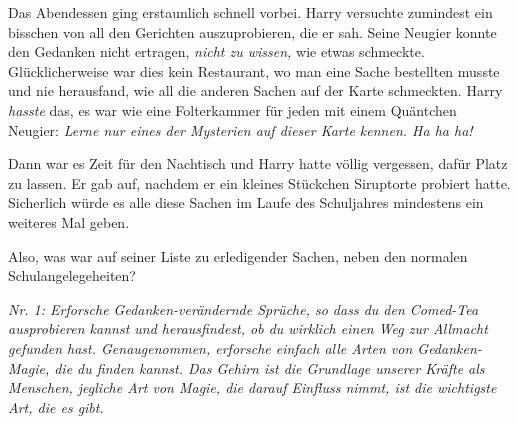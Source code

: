 Das Abendessen ging erstaunlich schnell vorbei. Harry versuchte zumindest ein bisschen von all den Gerichten auszuprobieren, die er sah. Seine Neugier konnte den Gedanken nicht ertragen, \emph{nicht zu wissen,} wie etwas schmeckte. Glücklicherweise war dies kein Restaurant, wo man eine Sache bestellten musste und nie herausfand, wie all die anderen Sachen auf der Karte schmeckten. Harry \emph{hasste} das, es war wie eine Folterkammer für jeden mit einem Quäntchen Neugier: \emph{Lerne nur eines der Mysterien auf dieser Karte kennen. Ha ha ha!}

Dann war es Zeit für den Nachtisch und Harry hatte völlig vergessen, dafür Platz zu lassen. Er gab auf, nachdem er ein kleines Stückchen Siruptorte probiert hatte. Sicherlich würde es alle diese Sachen im Laufe des Schuljahres mindestens ein weiteres Mal geben.

Also, was war auf seiner Liste zu erledigender Sachen, neben den normalen Schulangelegeheiten?

\emph{Nr. 1: Erforsche Gedanken-verändernde Sprüche, so dass du den Comed-Tea ausprobieren kannst und herausfindest, ob du wirklich einen Weg zur Allmacht gefunden hast. Genaugenommen, erforsche einfach alle Arten von Gedanken-Magie, die du finden kannst. Das Gehirn ist die Grundlage unserer Kräfte als Menschen, jegliche Art von Magie, die darauf Einfluss nimmt, ist die wichtigste Art, die es gibt.}

